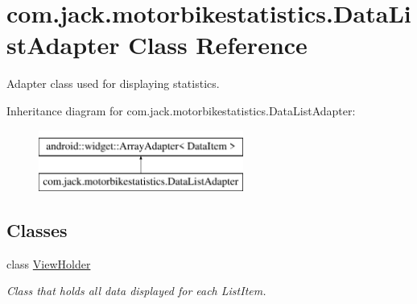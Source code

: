 \hypertarget{classcom_1_1jack_1_1motorbikestatistics_1_1_data_list_adapter}{}\section{com.\+jack.\+motorbikestatistics.\+Data\+List\+Adapter Class Reference}
\label{classcom_1_1jack_1_1motorbikestatistics_1_1_data_list_adapter}


Adapter class used for displaying statistics.  


Inheritance diagram for com.\+jack.\+motorbikestatistics.\+Data\+List\+Adapter\+:\begin{figure}[H]
\begin{center}
\leavevmode
\includegraphics[height=2.000000cm]{classcom_1_1jack_1_1motorbikestatistics_1_1_data_list_adapter}
\end{center}
\end{figure}
\subsection*{Classes}
\begin{DoxyCompactItemize}
\item 
class \hyperlink{classcom_1_1jack_1_1motorbikestatistics_1_1_data_list_adapter_1_1_view_holder}{View\+Holder}
\begin{DoxyCompactList}\small\item\em Class that holds all data displayed for each List\+Item. \end{DoxyCompactList}\end{DoxyCompactItemize}

